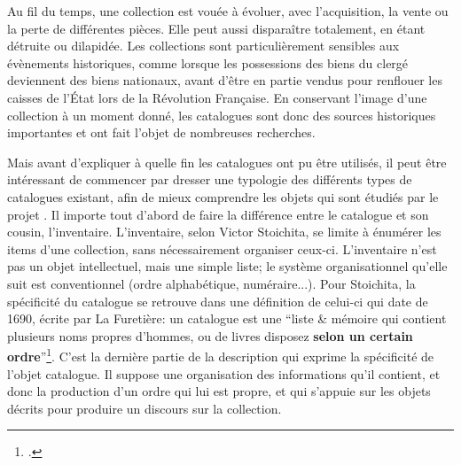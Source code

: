 Au fil du temps, une collection est vouée à évoluer, avec l'acquisition, la vente ou la perte de différentes pièces. Elle peut aussi disparaître totalement, en étant détruite ou dilapidée. Les collections sont particulièrement sensibles aux évènements historiques, comme lorsque les possessions des biens du clergé deviennent des biens nationaux, avant d'être en partie vendus pour renflouer les caisses de l'État lors de la Révolution Française. En conservant l'image d'une collection à un moment donné, les catalogues sont donc des sources historiques importantes et ont fait l'objet de nombreuses recherches.

Mais avant d'expliquer à quelle fin les catalogues ont pu être utilisés, il peut être intéressant de commencer par dresser une typologie des différents types de catalogues existant, afin de mieux comprendre les objets qui sont étudiés par le projet \mssktb{}. Il importe tout d'abord de faire la différence entre le catalogue et son cousin, l'inventaire. L'inventaire, selon Victor Stoichita, se limite à énumérer les items d'une collection, sans nécessairement organiser ceux-ci. L'inventaire n'est pas un objet intellectuel, mais une simple liste; le système organisationnel qu'elle suit est conventionnel (ordre alphabétique, numéraire...). Pour Stoichita, la spécificité du catalogue se retrouve dans une définition de celui-ci qui date de 1690, écrite par La Furetière: un catalogue est une \enquote{liste \& mémoire qui contient plusieurs noms propres d'hommes, ou de livres disposez \textbf{selon un certain ordre}}\footcite[p. 122]{stoichita_instauration_1993}. C'est la dernière partie de la description qui exprime la spécificité de l'objet catalogue. Il suppose une organisation des informations qu'il contient, et donc la production d'un ordre qui lui est propre, et qui s'appuie sur les objets décrits pour produire un discours sur la collection.

